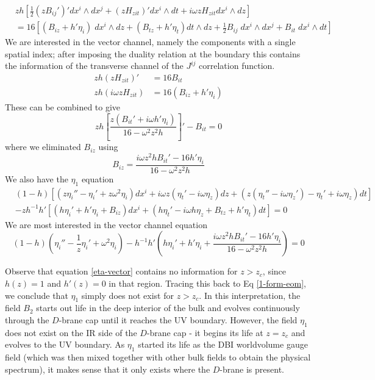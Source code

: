 \documentclass[aps,preprint,nofootinbib,preprintnumbers,eqsecnum,superscriptaddress]{revtex4}
\begin{document}
\begin{equation}
	\begin{split}
		& zh\left[\frac{1}{2}\left(zB_{ij}'\right)'dx^i \wedge dx^j + (zH_{zit})' dx^i \wedge dt + i \omega z H_{zit} dx^i \wedge dz \right]\\
		& = 16\left[(B_{iz}+h' \eta_i) \; dx^i \wedge dz + (B_{tz} + h' \eta_t) dt \wedge dz + \frac{1}{2} B_{ij} \; dx^i \wedge dx^j + B_{it} \; dx^i \wedge dt\right]
	\end{split}
\end{equation}
We are interested in the vector channel, namely the components with a single spatial index; after imposing the duality relation at the boundary this contains the information of the transverse channel of the $J^{ij}$ correlation function. 
\begin{subequations}
	\begin{align}
		zh (zH_{zit})'			& = 16 B_{it}	\\
		zh (i \omega z H_{zit}) & = 16(B_{iz}+h' \eta_i)
	\end{align}
\end{subequations}
These can be combined to give
\begin{equation}
	zh \left[\frac{z(B_{it}' + i \omega h' \eta_i)}{16 - \omega^2 z^2 h} \right]' - B_{it} = 0
\end{equation}
where we eliminated $B_{iz}$ using
\begin{equation}
	B_{iz} = \frac{i \omega z^2 h B_{it}' - 16h' \eta_i}{16 - \omega^2 z^2 h}
\end{equation}
We also have the $\eta_1$ equation 
\begin{align}
	&(1-h)\left[\left(z\eta_i'' - \eta_i' + z \omega^2 \eta_i\right) dx^i + i \omega z (\eta_t' - i \omega \eta_z) dz + (z (\eta_t'' - i \omega \eta_z') - \eta_t' + i \omega \eta_z)dt\right]		\\
	&- zh^{-1}h'[(h \eta_i' + h' \eta_i + B_{iz})dx^i + (h \eta_t' - i \omega h \eta_z + B_{tz} + h' \eta_t)dt] = 0
\end{align}
We are most interested in the vector channel equation
\begin{equation}
	\label{eta-vector}
	(1-h) \left(\eta_i'' - \frac{1}{z} \eta_i' + \omega^2 \eta_i \right) - h^{-1}h' \left(h \eta_i' + h' \eta_i + \frac{i \omega z^2 h B_{it}' - 16h' \eta_i}{16 - \omega^2 z^2 h}\right) = 0
\end{equation}

Observe that equation \ref{eta-vector} contains no information for $z > z_c$, since $h(z) = 1$ and $h'(z) = 0$ in that region. Tracing this back to Eq \ref{1-form-eom}, we conclude that $\eta_1$ simply does not exist for $z > z_c$. In this interpretation, the field $B_2$ starts out life in the deep interior of the bulk and evolves continuously through the $D$-brane cap until it reaches the UV boundary. However, the field $\eta_1$ does not exist on the IR side of the $D$-brane cap - it begins its life at $z = z_c$ and evolves to the UV boundary. As $\eta_1$ started its life as the DBI worldvolume gauge field (which was then mixed together with other bulk fields to obtain the physical spectrum), it makes sense that it only exists where the $D$-brane is present. 
\end{document}
